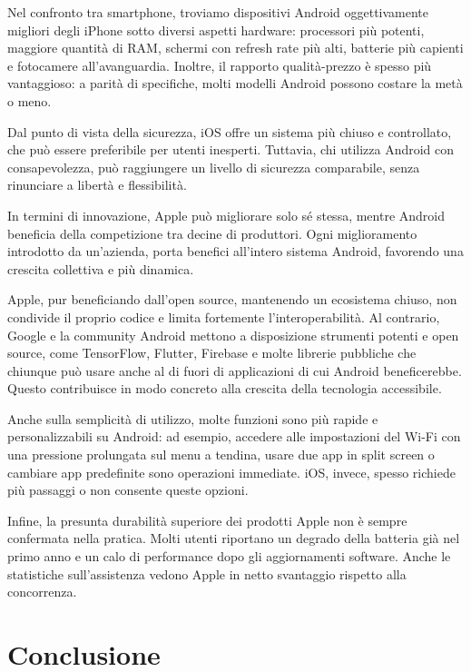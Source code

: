 \documentclass[12pt]{book} %
\begin{document}
\begin{mdframed}[linewidth=1pt]
Nel confronto tra smartphone, troviamo dispositivi Android oggettivamente migliori degli iPhone sotto diversi aspetti hardware: processori più potenti, maggiore quantità di RAM, schermi con refresh rate più alti, batterie più capienti e fotocamere all’avanguardia. Inoltre, il rapporto qualità-prezzo è spesso più vantaggioso: a parità di specifiche, molti modelli Android possono costare la metà o meno.

Dal punto di vista della sicurezza, iOS offre un sistema più chiuso e controllato, che può essere preferibile per utenti inesperti. Tuttavia, chi utilizza Android con consapevolezza, può raggiungere un livello di sicurezza comparabile, senza rinunciare a libertà e flessibilità.

In termini di innovazione, Apple può migliorare solo sé stessa, mentre Android beneficia della competizione tra decine di produttori. Ogni miglioramento introdotto da un’azienda, porta benefici all’intero sistema Android, favorendo una crescita collettiva e più dinamica.

Apple, pur beneficiando dall'open source, mantenendo un ecosistema chiuso, non condivide il proprio codice e limita fortemente l’interoperabilità. Al contrario, Google e la community Android mettono a disposizione strumenti potenti e open source, come TensorFlow, Flutter, Firebase e molte librerie pubbliche che chiunque può usare anche al di fuori di applicazioni di cui Android beneficerebbe. Questo contribuisce in modo concreto alla crescita della tecnologia accessibile.

Anche sulla semplicità di utilizzo, molte funzioni sono più rapide e personalizzabili su Android: ad esempio, accedere alle impostazioni del Wi-Fi con una pressione prolungata sul menu a tendina, usare due app in split screen o cambiare app predefinite sono operazioni immediate. iOS, invece, spesso richiede più passaggi o non consente queste opzioni.

Infine, la presunta durabilità superiore dei prodotti Apple non è sempre confermata nella pratica. Molti utenti riportano un degrado della batteria già nel primo anno e un calo di performance dopo gli aggiornamenti software. Anche le statistiche sull’assistenza vedono Apple in netto svantaggio rispetto alla concorrenza.
\end{mdframed}

\clearpage\section{Conclusione}
\end{document}
